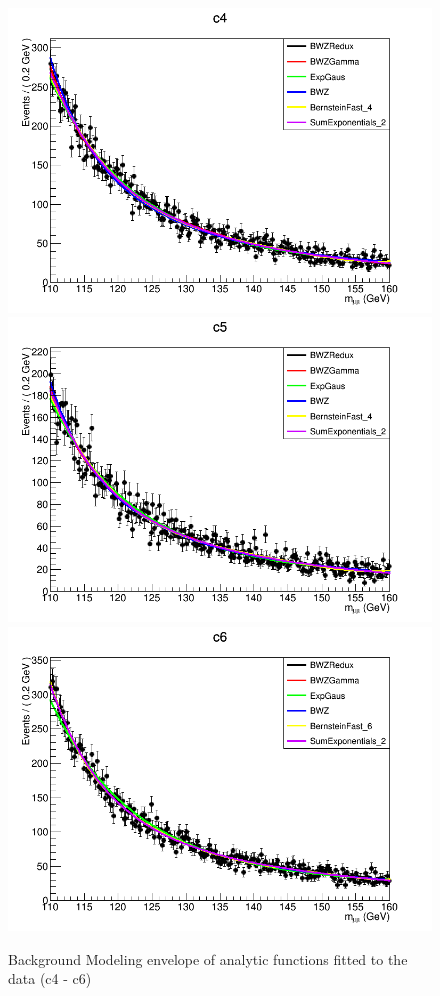 \begin{figure}[htbp]
  \centering
  \includegraphics[width=0.65\linewidth]{figures/ch_higgs/backgroundmodel/uf_bdt/backgroundFits__c4__bkgModels.png}\\
  \includegraphics[width=0.65\linewidth]{figures/ch_higgs/backgroundmodel/uf_bdt/backgroundFits__c5__bkgModels.png}\\
  \includegraphics[width=0.65\linewidth]{figures/ch_higgs/backgroundmodel/uf_bdt/backgroundFits__c6__bkgModels.png}
  \caption{Background Modeling envelope of analytic functions fitted to the data (c4 - c6)}
  \label{fig:higgs_bmodel_bdtc4c6}
\end{figure}
